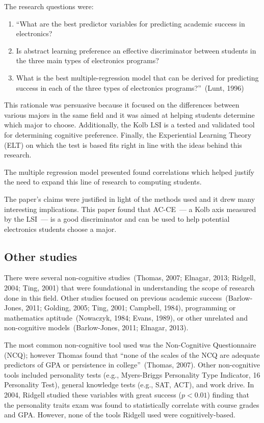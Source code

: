The research questions were:
\begin{enumerate}
  \item ``What are the best predictor variables for predicting academic success in electronics?
  \item Is abstract learning preference an effective discriminator between students in the three main types of electronics programs?
  \item What is the best multiple-regression model that can be derived for predicting success in each of the three types of electronics programs?''~(Lunt, 1996)
\end{enumerate}

This rationale was persuasive because it focused on the differences between various majors in the same field and it was aimed at helping students determine which major to choose. Additionally, the Kolb LSI is a tested and validated tool for determining cognitive preference. Finally, the Experiential Learning Theory (ELT) on which the test is based fits right in line with the ideas behind this research.

The multiple regression model presented found correlations which helped justify the need to expand this line of research to computing students.

The paper's claims were justified in light of the methods used and it drew many interesting implications. This paper found that AC-CE~--- a Kolb axis measured by the LSI~--- is a good discriminator and can be used to help potential electronics students choose a major.

\subsection{Other studies}
There were several non-cognitive studies~(Thomas, 2007; Elnagar, 2013; Ridgell, 2004; Ting, 2001) that were foundational in understanding the scope of research done in this field. Other studies focused on previous academic success~(Barlow-Jones, 2011; Golding, 2005; Ting, 2001; Campbell, 1984), programming or mathematics aptitude~(Nowaczyk, 1984; Evans, 1989), or other unrelated and non-cognitive models~(Barlow-Jones, 2011; Elnagar, 2013).

The most common non-cognitive tool used was the Non-Cognitive Questionnaire (NCQ); however Thomas found that ``none of the scales of the NCQ are adequate predictors of GPA or persistence in college''~(Thomas, 2007). Other non-cognitive tools included personality tests (e.g., Myers-Briggs Personality Type Indicator, 16 Personality Test), general knowledge tests (e.g., SAT, ACT), and work drive. In 2004, Ridgell studied these variables with great success ($p<0.01$) finding that the personality traits exam was found to statistically correlate with course grades and GPA. However, none of the tools Ridgell used were cognitively-based.

